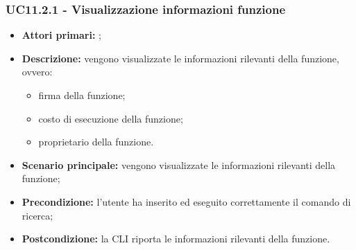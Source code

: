 \subsubsection{UC11.2.1 - Visualizzazione informazioni funzione }
\begin{itemize}
	\item \textbf{Attori primari:} \ua{};
	\item \textbf{Descrizione:} vengono visualizzate le informazioni rilevanti della funzione, ovvero:
	\begin{itemize}
		\item firma della funzione;
		\item costo di esecuzione della funzione;
		\item proprietario della funzione.
	\end{itemize}
	\item \textbf{Scenario principale:} vengono visualizzate le informazioni rilevanti della funzione; 
	\item \textbf{Precondizione:} l’utente ha inserito ed eseguito correttamente il comando di ricerca;  
	\item \textbf{Postcondizione:} la CLI riporta le informazioni rilevanti della funzione.
\end{itemize}